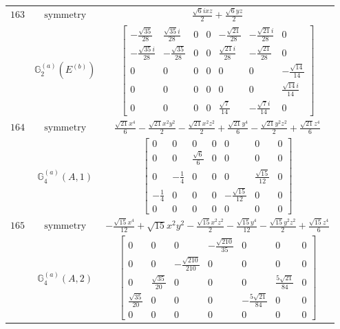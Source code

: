 \documentclass[fleqn,8pt,landscape]{jsarticle}
\begin{document}
\begin{longtable}{ccc}
$ 163 $ & $ \text{symmetry} $ & $ \frac{\sqrt{6} i x z}{2} + \frac{\sqrt{6} y z}{2} $ \\
$  $ & $ \mathbb{G}_{2}^{(a)}(E^{(b)}) $ & $ \begin{bmatrix} - \frac{\sqrt{35}}{28} & \frac{\sqrt{35} i}{28} & 0 & 0 & - \frac{\sqrt{21}}{28} & - \frac{\sqrt{21} i}{28} & 0 \\ - \frac{\sqrt{35} i}{28} & - \frac{\sqrt{35}}{28} & 0 & 0 & \frac{\sqrt{21} i}{28} & - \frac{\sqrt{21}}{28} & 0 \\ 0 & 0 & 0 & 0 & 0 & 0 & - \frac{\sqrt{14}}{14} \\ 0 & 0 & 0 & 0 & 0 & 0 & \frac{\sqrt{14} i}{14} \\ 0 & 0 & 0 & 0 & \frac{\sqrt{7}}{14} & - \frac{\sqrt{7} i}{14} & 0 \end{bmatrix} $ \\ \hline
$ 164 $ & $ \text{symmetry} $ & $ \frac{\sqrt{21} x^{4}}{6} - \frac{\sqrt{21} x^{2} y^{2}}{2} - \frac{\sqrt{21} x^{2} z^{2}}{2} + \frac{\sqrt{21} y^{4}}{6} - \frac{\sqrt{21} y^{2} z^{2}}{2} + \frac{\sqrt{21} z^{4}}{6} $ \\
$  $ & $ \mathbb{G}_{4}^{(a)}(A,1) $ & $ \begin{bmatrix} 0 & 0 & 0 & 0 & 0 & 0 & 0 \\ 0 & 0 & \frac{\sqrt{6}}{6} & 0 & 0 & 0 & 0 \\ 0 & - \frac{1}{4} & 0 & 0 & 0 & \frac{\sqrt{15}}{12} & 0 \\ - \frac{1}{4} & 0 & 0 & 0 & - \frac{\sqrt{15}}{12} & 0 & 0 \\ 0 & 0 & 0 & 0 & 0 & 0 & 0 \end{bmatrix} $ \\ \hline
$ 165 $ & $ \text{symmetry} $ & $ - \frac{\sqrt{15} x^{4}}{12} + \sqrt{15} x^{2} y^{2} - \frac{\sqrt{15} x^{2} z^{2}}{2} - \frac{\sqrt{15} y^{4}}{12} - \frac{\sqrt{15} y^{2} z^{2}}{2} + \frac{\sqrt{15} z^{4}}{6} $ \\
$  $ & $ \mathbb{G}_{4}^{(a)}(A,2) $ & $ \begin{bmatrix} 0 & 0 & 0 & - \frac{\sqrt{210}}{35} & 0 & 0 & 0 \\ 0 & 0 & - \frac{\sqrt{210}}{210} & 0 & 0 & 0 & 0 \\ 0 & \frac{\sqrt{35}}{20} & 0 & 0 & 0 & \frac{5 \sqrt{21}}{84} & 0 \\ \frac{\sqrt{35}}{20} & 0 & 0 & 0 & - \frac{5 \sqrt{21}}{84} & 0 & 0 \\ 0 & 0 & 0 & 0 & 0 & 0 & 0 \end{bmatrix} $ \\ \hline

\end{longtable}
\end{document}
